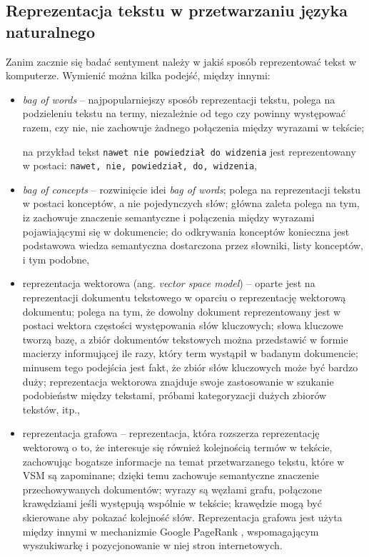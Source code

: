 \subsection{Reprezentacja tekstu w przetwarzaniu języka naturalnego}
Zanim zacznie się badać sentyment należy w jakiś sposób reprezentować tekst w
komputerze. Wymienić można kilka podejść, między innymi:
\begin{itemize}
  \item \textit{bag of words} \cite{BOWordsAndBOConcepts} -- najpopularniejszy
  sposób reprezentacji tekstu, polega na podzieleniu tekstu na termy,
  niezależnie od tego czy powinny występować razem, czy nie, nie zachowuje
  żadnego połączenia między wyrazami w tekście; 
  
  na przykład tekst 
  \texttt{nawet nie powiedział do widzenia} jest reprezentowany w postaci:
  \texttt{nawet, nie, powiedział, do, widzenia},
  
  
  \item \textit{bag of concepts} \cite{BOWordsAndBOConcepts} -- rozwinięcie idei
  \textit{bag of words}; polega na reprezentacji tekstu w postaci konceptów,
  a nie pojedynczych słów; główna zaleta polega na tym, iz zachowuje znaczenie
  semantyczne i połączenia między wyrazami pojawiającymi się w dokumencie; do
  odkrywania konceptów konieczna jest podstawowa wiedza semantyczna dostarczona
  przez słowniki, listy konceptów, i tym podobne,
  
  \item reprezentacja wektorowa (ang. \textit{vector space model})
  \cite{VectorSpaceModel} -- oparte jest na reprezentacji dokumentu tekstowego w
  oparciu o reprezentację wektorową dokumentu; polega na tym, że dowolny
  dokument reprezentowany jest w postaci wektora częstości występowania słów
  kluczowych; słowa kluczowe tworzą bazę, a zbiór dokumentów tekstowych
  można przedstawić w formie macierzy informującej ile razy, który term wystąpił
  w badanym dokumencie; minusem tego podejścia jest fakt, że zbiór słów
  kluczowych może być bardzo duży; reprezentacja wektorowa znajduje swoje
  zastosowanie w szukanie podobieństw między tekstami, próbami kategoryzacji
  dużych zbiorów tekstów, itp.,
  
  \item reprezentacja grafowa \cite{GraphBasedTextModel} -- reprezentacja,
  która rozszerza reprezentację wektorową o to, że interesuje się również
  kolejnością termów w tekście, zachowując bogatsze informacje na temat
  przetwarzanego tekstu, które w VSM są zapominane; dzięki temu zachowuje
  semantyczne znaczenie przechowywanych dokumentów; wyrazy są węzłami grafu,
  połączone krawędziami jeśli występują wspólnie w tekście; krawędzie mogą być
  skierowane aby pokazać kolejność słów. Reprezentacja grafowa jest użyta między
  innymi w mechanizmie Google PageRank \cite{TextNetworkModel}, wspomagającym
  wyszukiwarkę i pozycjonowanie w niej stron internetowych.  
\end{itemize}

